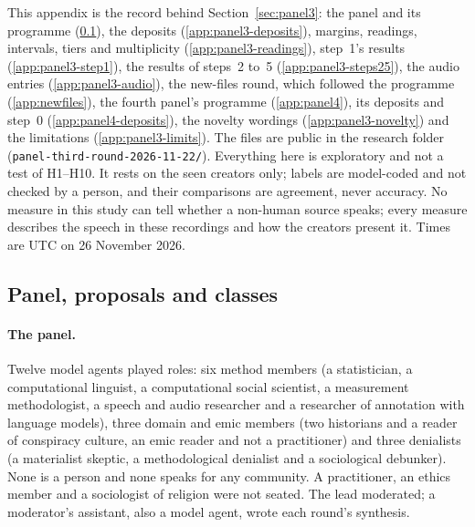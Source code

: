 This appendix is the record behind Section~\ref{sec:panel3}: the panel and its programme (\ref{app:panel3-design}),
the deposits (\ref{app:panel3-deposits}), margins, readings, intervals, tiers and multiplicity
(\ref{app:panel3-readings}), step~1's results (\ref{app:panel3-step1}), the results of steps~2 to~5
(\ref{app:panel3-steps25}), the audio entries (\ref{app:panel3-audio}), the new-files round, which
followed the programme (\ref{app:newfiles}), the fourth panel's programme (\ref{app:panel4}), its deposits and
step~0 (\ref{app:panel4-deposits}), the novelty wordings
(\ref{app:panel3-novelty}) and the limitations (\ref{app:panel3-limits}). The files are public in the research folder
(\texttt{panel-third-round-2026-11-22/}). Everything here is exploratory and not a test of H1--H10. It rests on the seen
creators only; labels are model-coded and not checked by a person, and their comparisons are agreement, never accuracy.
No measure in this study can tell whether a non-human source speaks; every measure describes the speech in these
recordings and how the creators present it. Times are UTC on 26 November 2026.

\subsection{Panel, proposals and classes}
\label{app:panel3-design}

\paragraph{The panel.} Twelve model agents played roles: six method members (a statistician, a computational linguist,
a computational social scientist, a measurement methodologist, a speech and audio researcher and a researcher of
annotation with language models), three domain and emic members (two historians and a reader of conspiracy culture, an
emic reader and not a practitioner) and three denialists (a materialist skeptic, a methodological denialist and a
sociological debunker). None is a person and none speaks for any community. A practitioner, an ethics member and a
sociologist of religion were not seated. The lead moderated; a moderator's assistant, also a model agent, wrote each
round's synthesis.

